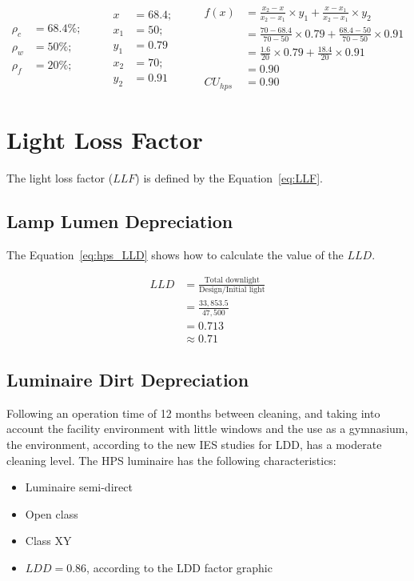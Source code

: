 \begin{equation}
\begin{split}
\rho_c &= 68.4\%; \\
\rho_w &= 50\%; \\
\rho_f &= 20\%;
\end{split}
\qquad
\begin{split}
x &= 68.4; \\
x_1 &= 50; \\ y_1 &= 0.79 \\
x_2 &= 70; \\ y_2 &= 0.91
\end{split}
\qquad
\begin{split}
f(x) &= \frac{x_2 - x}{x_2 - x_1} \times y_1 +
       \frac{x - x_1}{x_2 - x_1} \times y_2 \\
 &= \frac{70 - 68.4}{70 - 50} \times 0.79 +
    \frac{68.4 - 50}{70 - 50} \times 0.91 \\
 &= \frac{1.6}{20} \times 0.79 +
    \frac{18.4}{20} \times 0.91 \\
 & = 0.90 \\
CU_{hps} & = 0.90
\end{split}
\label{eq:hps_cu}
\end{equation}

\section{Light Loss Factor}
The light loss factor ($LLF$) is defined by the Equation~\ref{eq:LLF}.

\subsection{Lamp Lumen Depreciation}
The Equation~\ref{eq:hps_LLD} shows how to calculate the value of the $LLD$.

\begin{equation}
\begin{split}
LLD & = \frac{\text{Total downlight}}{\text{Design/Initial light}} \\
 & = \frac{33,853.5}{47,500} \\
 & =  0.713 \\
 & \approx 0.71
\end{split}
\label{eq:hps_LLD}
\end{equation}

\subsection{Luminaire Dirt Depreciation}
Following an operation time of 12 months between cleaning, and taking into account the facility environment with little windows and the use as a gymnasium, the environment, according to the new IES studies for LDD, has a moderate cleaning level. The HPS luminaire has the following characteristics:
\begin{itemize}
\item Luminaire semi-direct
\item Open class
\item Class XY
\item $LDD = 0.86$, according to the LDD factor graphic
\end{itemize}


